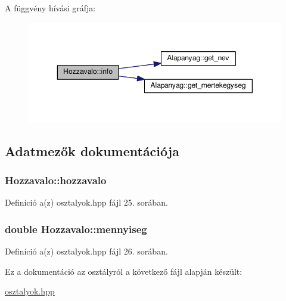 A függvény hívási gráfja\+:
\nopagebreak
\begin{figure}[H]
\begin{center}
\leavevmode
\includegraphics[width=350pt]{classHozzavalo_aee49a4ae7c61f37d1bfee9d5115db4ff_cgraph}
\end{center}
\end{figure}




\subsection{Adatmezők dokumentációja}
\subsubsection[{\texorpdfstring{hozzavalo}{hozzavalo}}]{ Hozzavalo\+::hozzavalo\hspace{0.3cm}{\ttfamily [private]}}\hypertarget{classHozzavalo_ac2fd17dda552803cb220e9ea22be6793}{}\label{classHozzavalo_ac2fd17dda552803cb220e9ea22be6793}


Definíció a(z) osztalyok.\+hpp fájl 25. sorában.

\subsubsection[{\texorpdfstring{mennyiseg}{mennyiseg}}]{\setlength{\rightskip}{0pt plus 5cm}double Hozzavalo\+::mennyiseg\hspace{0.3cm}{\ttfamily [private]}}\hypertarget{classHozzavalo_a31c9579b4bd274ef7ad5e934a90e0780}{}\label{classHozzavalo_a31c9579b4bd274ef7ad5e934a90e0780}


Definíció a(z) osztalyok.\+hpp fájl 26. sorában.



Ez a dokumentáció az osztályról a következő fájl alapján készült\+:\begin{DoxyCompactItemize}
\item 
\hyperlink{osztalyok_8hpp}{osztalyok.\+hpp}\end{DoxyCompactItemize}
